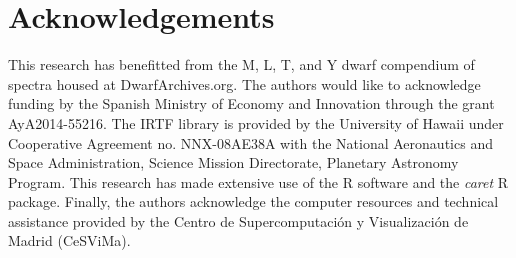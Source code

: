 \documentclass[a4paper,fleqn,usenatbib]{mnras}
\begin{document}
\section*{Acknowledgements}
This research has benefitted from the M, L, T, and Y dwarf compendium
of spectra housed at DwarfArchives.org.  The authors would like to
acknowledge funding by the Spanish Ministry of Economy and Innovation
through the grant AyA2014-55216. The IRTF library is provided by the
University of Hawaii under Cooperative Agreement no. NNX-08AE38A with
the National Aeronautics and Space Administration, Science Mission
Directorate, Planetary Astronomy Program. This research has made
extensive use of the R software \cite{R} and the {\it caret} R
package. Finally, the authors acknowledge the computer resources and
technical assistance provided by the Centro de Supercomputaci\'on y
Visualizaci\'on de Madrid (CeSViMa).



\begin{appendix}
\label{app}



\end{appendix}


{}

\end{document}
